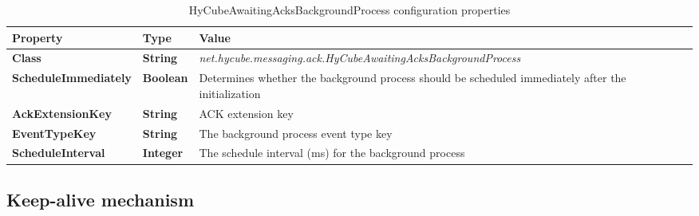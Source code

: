 \begin{table}
\scriptsize
\begin{center}
\begin{tabular}{p{5.5cm} p{1.0cm} p{8.0cm}}
	\hline
	\textbf{Property}							& \textbf{Type}					& \textbf{Value}					\\[1mm]
    \hline
	\textbf{Class}								& \textbf{String}				& \textit{net.hycube.messaging.ack.HyCubeAwaitingAcksBackgroundProcess}										\\[1.5mm]	
	\textbf{ScheduleImmediately}				& \textbf{Boolean}				& Determines whether the background process should be scheduled immediately after the initialization		\\[1.5mm]	
	\textbf{AckExtensionKey}					& \textbf{String}				& ACK extension key																							\\[1.5mm]	
	\textbf{EventTypeKey}						& \textbf{String}				& The background process event type key																		\\[1.5mm]	
	\textbf{ScheduleInterval}					& \textbf{Integer}				& The schedule interval (ms) for the background process															\\[1.5mm]	
    \hline
\end{tabular}
\end{center}
\caption{HyCubeAwaitingAcksBackgroundProcess configuration properties}
\label{tab:libHyCubeAwaitingAcksBackgroundProcess}
\end{table}












\subsection{Keep-alive mechanism}
\label{sec:keepAliveMechanism}


